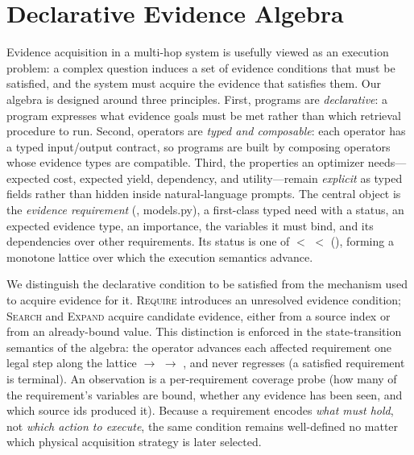 \section{Declarative Evidence Algebra}
\label{sec:algebra}

Evidence acquisition in a multi-hop system is usefully viewed as an execution
problem: a complex question induces a set of evidence conditions that must be
satisfied, and the system must acquire the evidence that satisfies them. Our
algebra is designed around three principles. First, programs are
\emph{declarative}: a program expresses what evidence goals must be met rather
than which retrieval procedure to run. Second, operators are \emph{typed and
composable}: each operator has a typed input/output contract, so programs are
built by composing operators whose evidence types are compatible. Third, the
properties an optimizer needs---expected cost, expected yield, dependency, and
utility---remain \emph{explicit} as typed fields rather than hidden inside
natural-language prompts. The central object is the
\emph{evidence requirement} (, models.py), a
first-class typed need with a status, an expected evidence type, an importance,
the variables it must bind, and its dependencies over other requirements. Its
status is one of  $<$  $<$ 
(), forming a monotone lattice over which the execution
semantics advance.

We distinguish the declarative condition to be satisfied from the mechanism
used to acquire evidence for it. \textsc{Require} introduces an unresolved
evidence condition; \textsc{Search} and \textsc{Expand} acquire candidate
evidence, either from a source index or from an already-bound value. This
distinction is enforced in the state-transition semantics of the algebra: the
operator  advances each affected
requirement one legal step along the lattice  $\rightarrow$
 $\rightarrow$ , and never regresses (a satisfied
requirement is terminal). An observation is a per-requirement coverage probe
(how many of the requirement's variables are bound, whether any evidence has
been seen, and which source ids produced it). Because a requirement encodes
\emph{what must hold}, not \emph{which action to execute}, the same condition
remains well-defined no matter which physical acquisition strategy is later
selected.


